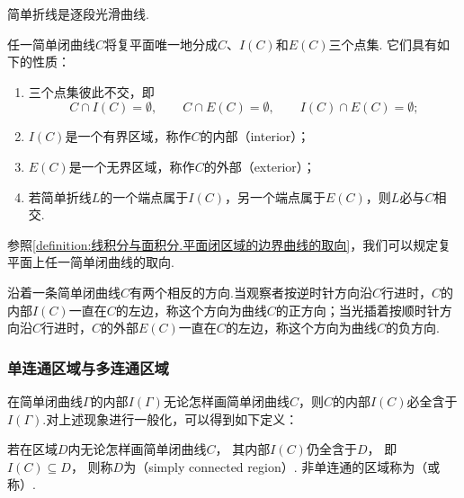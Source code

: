 \begin{example}
简单折线是逐段光滑曲线.
\end{example}

\begin{theorem}[若尔当定理]
任一简单闭曲线\(C\)将复平面唯一地分成\(C\)、\(I(C)\)和\(E(C)\)三个点集.
它们具有如下的性质：\begin{enumerate}
\item 三个点集彼此不交，即\[
C \cap I(C) = \emptyset,
\qquad
C \cap E(C) = \emptyset,
\qquad
I(C) \cap E(C) = \emptyset;
\]
\item \(I(C)\)是一个有界区域，称作\(C\)的内部（interior）；
\item \(E(C)\)是一个无界区域，称作\(C\)的外部（exterior）；
\item 若简单折线\(L\)的一个端点属于\(I(C)\)，另一个端点属于\(E(C)\)，则\(L\)必与\(C\)相交.
\end{enumerate}
\end{theorem}

参照\cref{definition:线积分与面积分.平面闭区域的边界曲线的取向}，我们可以规定复平面上任一简单闭曲线的取向.
\begin{definition}
沿着一条简单闭曲线\(C\)有两个相反的方向.当观察者按逆时针方向沿\(C\)行进时，\(C\)的内部\(I(C)\)一直在\(C\)的左边，称这个方向为曲线\(C\)的正方向；当光插着按顺时针方向沿\(C\)行进时，\(C\)的外部\(E(C)\)一直在\(C\)的左边，称这个方向为曲线\(C\)的负方向.
\end{definition}

\subsubsection{单连通区域与多连通区域}
在简单闭曲线\(\Gamma\)的内部\(I(\Gamma)\)无论怎样画简单闭曲线\(C\)，则\(C\)的内部\(I(C)\)必全含于\(I(\Gamma)\).对上述现象进行一般化，可以得到如下定义：
\begin{definition}
若在区域\(D\)内无论怎样画简单闭曲线\(C\)，
其内部\(I(C)\)仍全含于\(D\)，
即\(I(C) \subseteq D\)，
则称\(D\)为（simply connected region）.
非单连通的区域称为（或称）.
\end{definition}

